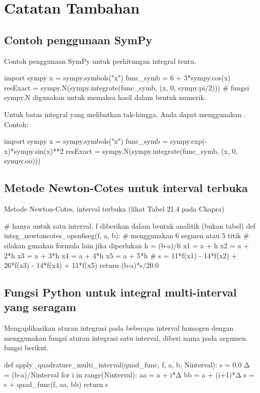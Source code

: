\section{Catatan Tambahan}

\subsection{Contoh penggunaan SymPy}
Contoh penggunaan SymPy untuk perhitungan integral tentu.
\begin{pythoncode}
import sympy
x = sympy.symbols("x")
func_symb = 6 + 3*sympy.cos(x)
resExact = sympy.N(sympy.integrate(func_symb, (x, 0, sympy.pi/2)))
# fungsi sympy.N digunakan untuk memaksa hasil dalam bentuk numerik.
\end{pythoncode}

Untuk batas integral yang melibatkan tak-hingga, Anda dapat menggunakan
. Contoh:
\begin{pythoncode}
import sympy
x = sympy.symbols("x")
func_symb = sympy.exp(-x)*sympy.sin(x)**2
resExact = sympy.N(sympy.integrate(func_symb, (x, 0, sympy.oo)))
\end{pythoncode}


\subsection{Metode Newton-Cotes untuk interval terbuka}

Metode Newton-Cotes, interval terbuka (lihat Tabel 21.4 pada Chapra)
\begin{pythoncode}
# hanya untuk satu interval, f diberikan dalam bentuk analitik (bukan tabel)
def integ_newtoncotes_open6seg(f, a, b):
    # menggunakan 6 segmen atau 5 titik
    # silakan gunakan formula lain jika diperlukan
    h = (b-a)/6
    x1 = a + h
    x2 = a + 2*h
    x3 = a + 3*h
    x4 = a + 4*h
    x5 = a + 5*h
    #
    s = 11*f(x1) - 14*f(x2) + 26*f(x3) - 14*f(x4) + 11*f(x5)
    return (b-a)*s/20.0
\end{pythoncode}


\subsection{Fungsi Python untuk integral multi-interval yang seragam}

Mengaplikasikan aturan integrasi pada beberapa interval homogen
dengan menggunakan fungsi aturan integrasi satu interval, diberi nama
 pada argumen fungsi berikut.
\begin{pythoncode}
def apply_quadrature_multi_interval(quad_func, f, a, b, Ninterval):
    s = 0.0
    Δ = (b-a)/Ninterval
    for i in range(Ninterval):
        aa = a + i*Δ
        bb = a + (i+1)*Δ
        s = s + quad_func(f, aa, bb)
    return s
\end{pythoncode}

